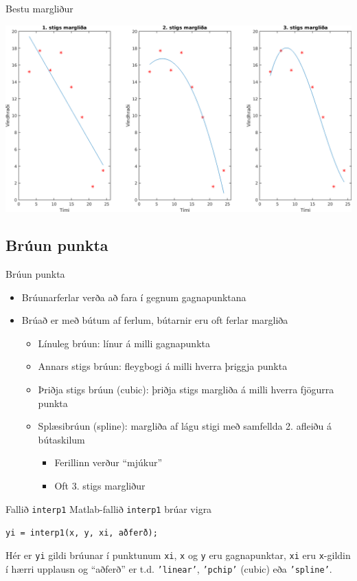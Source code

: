 \documentclass{beamer}
\begin{document}
\begin{frame}[fragile]{Bestu margliður}
\begin{center}
\includegraphics[height=0.6\textheight]{Pics/poly-subplot}
\end{center}
\end{frame}


\subsection{Brúun punkta}

\begin{frame}[fragile]{Brúun punkta}
\begin{itemize}
 \item Brúunarferlar verða að fara í gegnum gagnapunktana
 \item Brúað er með bútum af ferlum, bútarnir eru oft ferlar margliða
 \begin{itemize}
  \item Línuleg brúun: línur á milli gagnapunkta
  \item Annars stigs brúun:  fleygbogi á milli hverra þriggja punkta
  \item Þriðja stigs brúun (cubic):  þriðja stigs margliða á milli hverra fjögurra punkta
  \item Splæsibrúun (spline): margliða af lágu stigi með samfellda 2. afleiðu á bútaskilum
  \begin{itemize}
   \item Ferillinn verður ``mjúkur''
   \item Oft 3. stigs margliður
  \end{itemize}
 \end{itemize}
\end{itemize}
\end{frame}

\begin{frame}[fragile]{Fallið \texttt{interp1}}
Matlab-fallið \texttt{interp1} brúar vigra
\begin{center}
\texttt{yi = interp1(x, y, xi, aðferð);}
\end{center}
Hér er \texttt{yi} gildi brúunar í punktunum \texttt{xi}, \texttt{x} og \texttt{y} eru gagnapunktar, \texttt{xi} eru \texttt{x}-gildin í hærri upplausn og ``aðferð'' er t.d.  \texttt{'linear'}, \texttt{'pchip'} (cubic) eða \texttt{'spline'}.
\end{frame}
\end{document}

